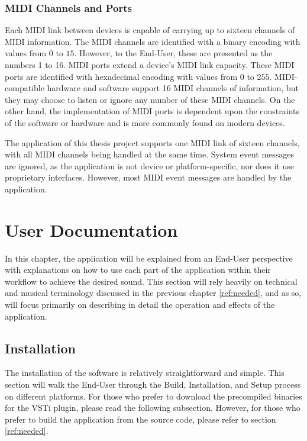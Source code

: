 \documentclass[a4paper,12pt]{report}
\begin{document}
\subsection{MIDI Channels and Ports}
Each MIDI link between devices is capable of carrying up to sixteen channels of MIDI information. The MIDI channels are identified with a binary encoding with values from $0$ to $15$. However, to the End-User, these are presented as the numbers 1 to 16. MIDI ports extend a device's MIDI link capacity. These MIDI ports are identified with hexadecimal encoding with values from $0$ to $255$. MIDI-compatible hardware and software support 16 MIDI channels of information, but they may choose to listen or ignore any number of these MIDI channels. On the other hand, the implementation of MIDI ports is dependent upon the constraints of the software or hardware and is more commonly found on modern devices.

The application of this thesis project supports one MIDI link of sixteen channels, with all MIDI channels being handled at the same time. System event messages are ignored, as the application is not device or platform-specific, nor does it use proprietary interfaces. However, most MIDI event messages are handled by the application.


\chapter{User Documentation}
In this chapter, the application will be explained from an End-User perspective with explanations on how to use each part of the application within their workflow to achieve the desired sound. This section will rely heavily on technical and musical terminology discussed in the previous chapter \ref{ref:needed}, and as so, will focus primarily on describing in detail the operation and effects of the application.

\section{Installation}
The installation of the software is relatively straightforward and simple. This section will walk the End-User through the Build, Installation, and Setup process on different platforms. For those who prefer to download the precompiled binaries for the VSTi plugin, please read the following subsection. However, for those who prefer to build the application from the source code, please refer to section \ref{ref:needed}.
\end{document}
